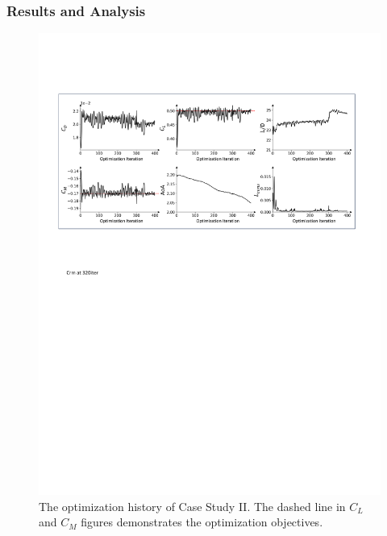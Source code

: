 \subsubsection{Results and Analysis}



\begin{figure}[!t]
    \begin{center}
        \includegraphics[width=1\linewidth]{chapter5/fig/crm_optim_history.pdf}
    \end{center}
    \caption{
        \small The optimization history of Case Study II. The dashed line in $C_L$ and $C_M$ figures demonstrates the optimization objectives.
    }
    \label{ch5:fig:cs2_history}
\end{figure}

